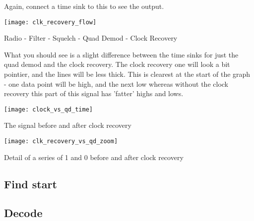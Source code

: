 Again, connect a time sink to this to see the output.


\centrefigurestart
\texttt{[image: clk\_recovery\_flow]}
\caption{Radio - Filter - Squelch - Quad Demod - Clock Recovery}
\centrefigureend

What you should see is a slight difference between the time sinks for just the quad demod and the clock recovery. The clock recovery one will look a bit pointier, and the lines will be less thick. This is clearest at the start of the graph - one data point will be high, and the next low whereas without the clock recovery this part of this signal has 'fatter' highs and lows.

\centrefigurestart
\texttt{[image: clock\_vs\_qd\_time]}
\caption{The signal before and after clock recovery}
\centrefigureend

\centrefigurestart
\texttt{[image: clk\_recovery\_vs\_qd\_zoom]}
\caption{Detail of a series of 1 and 0 before and after clock recovery}
\centrefigureend

\subsection{Find start}

\subsection{Decode}
